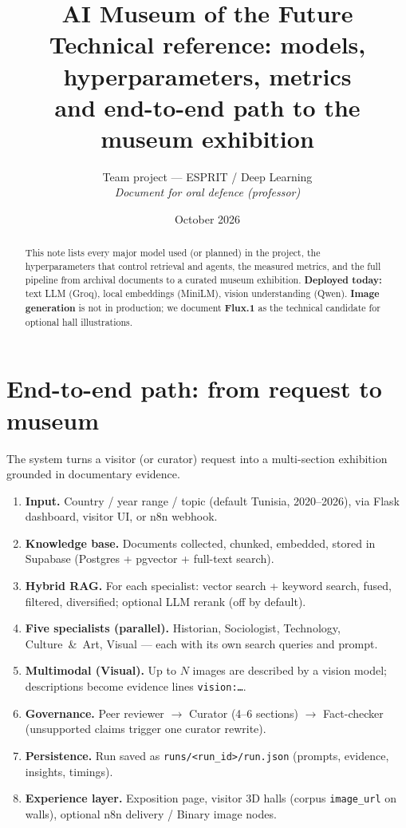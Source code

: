 \documentclass[11pt,a4paper]{article}
\title{\textbf{AI Museum of the Future}\\[0.4em]
\large Technical reference: models, hyperparameters, metrics\\
and end-to-end path to the museum exhibition}
\author{Team project --- ESPRIT / Deep Learning\\
\textit{Document for oral defence (professor)}}
\date{October 2026}
\begin{document}
\maketitle
\begin{abstract}
\noindent
This note lists every major model used (or planned) in the project, the
hyperparameters that control retrieval and agents, the measured metrics, and
the full pipeline from archival documents to a curated museum exhibition.
\textbf{Deployed today:} text LLM (Groq), local embeddings (MiniLM), vision
understanding (Qwen). \textbf{Image generation} is not in production; we
document \textbf{Flux.1} as the technical candidate for optional hall
illustrations.
\end{abstract}

\tableofcontents
\vspace{1em}

\section{End-to-end path: from request to museum}

The system turns a visitor (or curator) request into a multi-section exhibition
grounded in documentary evidence.

\begin{enumerate}[leftmargin=*,itemsep=2pt]
  \item \textbf{Input.} Country / year range / topic (default Tunisia, 2020--2026),
        via Flask dashboard, visitor UI, or n8n webhook.
  \item \textbf{Knowledge base.} Documents collected, chunked, embedded, stored in
        Supabase (Postgres + pgvector + full-text search).
  \item \textbf{Hybrid RAG.} For each specialist: vector search + keyword search,
        fused, filtered, diversified; optional LLM rerank (off by default).
  \item \textbf{Five specialists (parallel).} Historian, Sociologist, Technology,
        Culture~\&~Art, Visual --- each with its own search queries and prompt.
  \item \textbf{Multimodal (Visual).} Up to $N$ images are described by a vision
        model; descriptions become evidence lines \texttt{vision:\ldots}.
  \item \textbf{Governance.} Peer reviewer $\rightarrow$ Curator (4--6 sections)
        $\rightarrow$ Fact-checker (unsupported claims trigger one curator rewrite).
  \item \textbf{Persistence.} Run saved as \texttt{runs/<run\_id>/run.json}
        (prompts, evidence, insights, timings).
  \item \textbf{Experience layer.} Exposition page, visitor 3D halls (corpus
        \texttt{image\_url} on walls), optional n8n delivery / Binary image nodes.
\end{enumerate}
\end{document}

